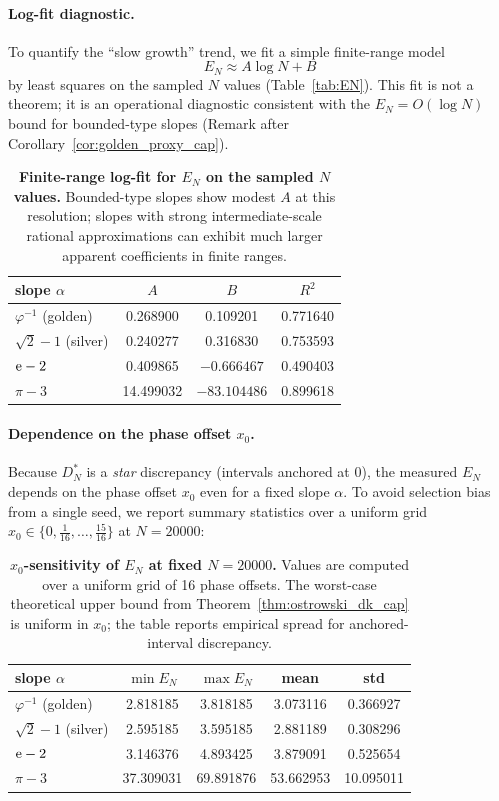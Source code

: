 \paragraph{Log-fit diagnostic.}
To quantify the ``slow growth'' trend, we fit a simple finite-range model
\begin{equation}
  E_N \approx A\log N + B
\end{equation}
by least squares on the sampled $N$ values (Table~\ref{tab:EN}).
This fit is not a theorem; it is an operational diagnostic consistent with the $E_N=O(\log N)$ bound for bounded-type slopes (Remark after Corollary~\ref{cor:golden_proxy_cap}).

\begin{table}[t]
\centering
\begin{tabular}{@{}lccc@{}}
\toprule
slope $\alpha$ & $A$ & $B$ & $R^2$ \\
\midrule
$\varphi^{-1}$ (golden) & 0.268900 & 0.109201 & 0.771640 \\
$\sqrt{2}-1$ (silver) & 0.240277 & 0.316830 & 0.753593 \\
$\mathrm{e}-2$ & 0.409865 & $-0.666467$ & 0.490403 \\
$\pi-3$ & 14.499032 & $-83.104486$ & 0.899618 \\
\bottomrule
\end{tabular}
\caption{\textbf{Finite-range log-fit for $E_N$ on the sampled $N$ values.} Bounded-type slopes show modest $A$ at this resolution; slopes with strong intermediate-scale rational approximations can exhibit much larger apparent coefficients in finite ranges.}
\label{tab:EN_fit}
\end{table}

\paragraph{Dependence on the phase offset $x_0$.}
Because $D_N^\ast$ is a \emph{star} discrepancy (intervals anchored at $0$), the measured $E_N$ depends on the phase offset $x_0$ even for a fixed slope $\alpha$.
To avoid selection bias from a single seed, we report summary statistics over a uniform grid $x_0\in\{0,\tfrac{1}{16},\dots,\tfrac{15}{16}\}$ at $N=20000$:
\begin{table}[t]
\centering
\begin{tabular}{@{}lcccc@{}}
\toprule
slope $\alpha$ & $\min E_N$ & $\max E_N$ & mean & std \\
\midrule
$\varphi^{-1}$ (golden) & 2.818185 & 3.818185 & 3.073116 & 0.366927 \\
$\sqrt{2}-1$ (silver) & 2.595185 & 3.595185 & 2.881189 & 0.308296 \\
$\mathrm{e}-2$ & 3.146376 & 4.893425 & 3.879091 & 0.525654 \\
$\pi-3$ & 37.309031 & 69.891876 & 53.662953 & 10.095011 \\
\bottomrule
\end{tabular}
\caption{\textbf{$x_0$-sensitivity of $E_N$ at fixed $N=20000$.} Values are computed over a uniform grid of 16 phase offsets. The worst-case theoretical upper bound from Theorem~\ref{thm:ostrowski_dk_cap} is uniform in $x_0$; the table reports empirical spread for anchored-interval discrepancy.}
\label{tab:EN_x0}
\end{table}

